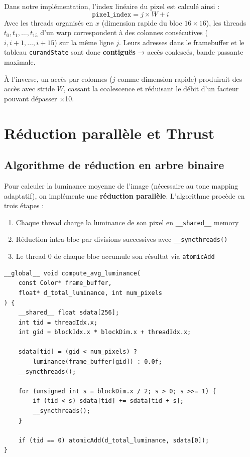 \documentclass[12pt,a4paper]{article}
\begin{document}
Dans notre implémentation, l'index linéaire du pixel est calculé ainsi :
\[
\texttt{pixel\_index} = j \times W + i
\]
Avec les threads organisés en $x$ (dimension rapide du bloc $16\times16$), les threads
$t_0, t_1, \ldots, t_{15}$ d'un warp correspondent à des colonnes consécutives
($i, i+1, \ldots, i+15$) sur la même ligne $j$. Leurs adresses dans le framebuffer
et le tableau \texttt{curandState} sont donc \textbf{contiguës} → accès coalescés,
bande passante maximale.

À l'inverse, un accès par colonnes ($j$ comme dimension rapide) produirait des
accès avec stride $W$, cassant la coalescence et réduisant le débit d'un facteur
pouvant dépasser $\times$10.

\section{Réduction parallèle et Thrust}

\subsection{Algorithme de réduction en arbre binaire}

Pour calculer la luminance moyenne de l'image (nécessaire au tone mapping adaptatif),
on implémente une \textbf{réduction parallèle}. L'algorithme procède en trois étapes :

\begin{enumerate}
    \item Chaque thread charge la luminance de son pixel en \texttt{\_\_shared\_\_} memory
    \item Réduction intra-bloc par divisions successives avec \texttt{\_\_syncthreads()}
    \item Le thread 0 de chaque bloc accumule son résultat via \texttt{atomicAdd}
\end{enumerate}

\begin{lstlisting}[caption={Kernel de réduction parallèle (extrait)}]
__global__ void compute_avg_luminance(
    const Color* frame_buffer,
    float* d_total_luminance, int num_pixels
) {
    __shared__ float sdata[256];
    int tid = threadIdx.x;
    int gid = blockIdx.x * blockDim.x + threadIdx.x;

    sdata[tid] = (gid < num_pixels) ?
        luminance(frame_buffer[gid]) : 0.0f;
    __syncthreads();

    for (unsigned int s = blockDim.x / 2; s > 0; s >>= 1) {
        if (tid < s) sdata[tid] += sdata[tid + s];
        __syncthreads();
    }

    if (tid == 0) atomicAdd(d_total_luminance, sdata[0]);
}
\end{lstlisting}
\end{document}
